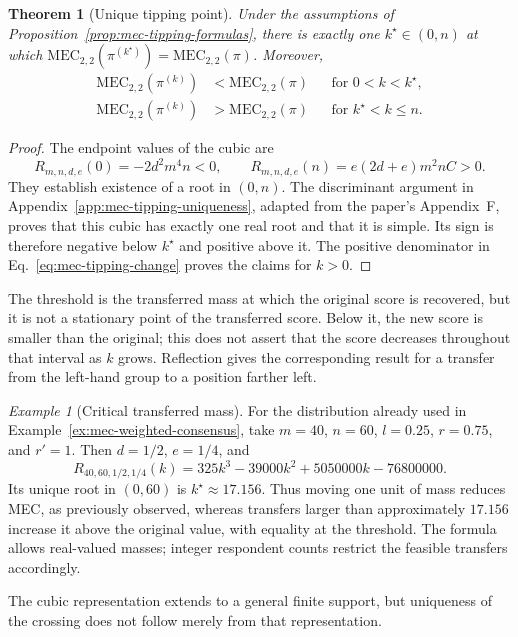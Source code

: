 \documentclass{article}
\theoremstyle{plain}
\newtheorem{theorem}{Theorem}
\theoremstyle{remark}
\newtheorem{example}{Example}
\begin{document}
\begin{theorem}[Unique tipping point]\label{th:mec-tipping-point}
Under the assumptions of Proposition~\ref{prop:mec-tipping-formulas}, there is exactly one $k^\star\in(0,n)$ at which $\mathrm{MEC}_{2,2}(\pi^{(k^\star)})=\mathrm{MEC}_{2,2}(\pi)$. Moreover,
\[
\begin{aligned}
\mathrm{MEC}_{2,2}(\pi^{(k)})&<\mathrm{MEC}_{2,2}(\pi)
 &&\text{for }0<k<k^\star,\\
\mathrm{MEC}_{2,2}(\pi^{(k)})&>\mathrm{MEC}_{2,2}(\pi)
 &&\text{for }k^\star<k\leq n.
\end{aligned}
\]
\end{theorem}
\begin{proof}
The endpoint values of the cubic are
\[
R_{m,n,d,e}(0)=-2d^2m^4n<0,\qquad
R_{m,n,d,e}(n)=e(2d+e)m^2nC>0.
\]
They establish existence of a root in $(0,n)$. The discriminant argument in Appendix~\ref{app:mec-tipping-uniqueness}, adapted from the paper's Appendix~F, proves that this cubic has exactly one real root and that it is simple. Its sign is therefore negative below $k^\star$ and positive above it. The positive denominator in Eq.~\eqref{eq:mec-tipping-change} proves the claims for $k>0$.
\end{proof}

The threshold is the transferred mass at which the original score is recovered, but it is not a stationary point of the transferred score. Below it, the new score is smaller than the original; this does not assert that the score decreases throughout that interval as $k$ grows. Reflection gives the corresponding result for a transfer from the left-hand group to a position farther left.

\begin{example}[Critical transferred mass]\label{ex:mec-tipping-point}
For the distribution already used in Example~\ref{ex:mec-weighted-consensus}, take $m=40$, $n=60$, $l=0.25$, $r=0.75$, and $r'=1$. Then $d=1/2$, $e=1/4$, and
\[
R_{40,60,1/2,1/4}(k)
=325k^3-39000k^2+5050000k-76800000.
\]
Its unique root in $(0,60)$ is $k^\star\approx17.156$. Thus moving one unit of mass reduces MEC, as previously observed, whereas transfers larger than approximately $17.156$ increase it above the original value, with equality at the threshold. The formula allows real-valued masses; integer respondent counts restrict the feasible transfers accordingly.
\end{example}

The cubic representation extends to a general finite support, but uniqueness of the crossing does not follow merely from that representation.
\end{document}
